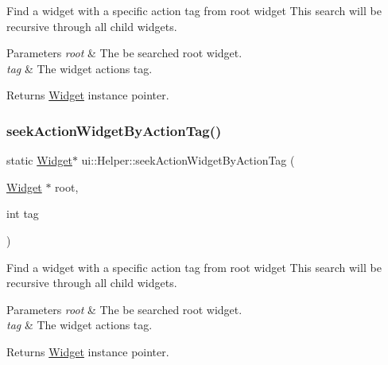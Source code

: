 Find a widget with a specific action tag from root widget This search will be recursive through all child widgets. 
\begin{DoxyParams}{Parameters}
{\em root} & The be searched root widget. \\
\hline
{\em tag} & The widget action\textquotesingle{}s tag. \\
\hline
\end{DoxyParams}
\begin{DoxyReturn}{Returns}
\hyperlink{classui_1_1Widget}{Widget} instance pointer. 
\end{DoxyReturn}
\mbox{\label{classui_1_1Helper_a5b0826f5d6ef090b55c6b021aa9bed55}} 
\subsubsection{\texorpdfstring{seek\+Action\+Widget\+By\+Action\+Tag()}{seekActionWidgetByActionTag()}\hspace{0.1cm}{\footnotesize\ttfamily [2/2]}}
{\footnotesize\ttfamily static \hyperlink{classui_1_1Widget}{Widget}$\ast$ ui\+::\+Helper\+::seek\+Action\+Widget\+By\+Action\+Tag (\begin{DoxyParamCaption}\item[{\hyperlink{classui_1_1Widget}{Widget} $\ast$}]{root,  }\item[{int}]{tag }\end{DoxyParamCaption})\hspace{0.3cm}{\ttfamily [static]}}

Find a widget with a specific action tag from root widget This search will be recursive through all child widgets. 
\begin{DoxyParams}{Parameters}
{\em root} & The be searched root widget. \\
\hline
{\em tag} & The widget action\textquotesingle{}s tag. \\
\hline
\end{DoxyParams}
\begin{DoxyReturn}{Returns}
\hyperlink{classui_1_1Widget}{Widget} instance pointer. 
\end{DoxyReturn}
\mbox{\label{classui_1_1Helper_ad5f762a32af9813af650c1e94e17c957}} 
